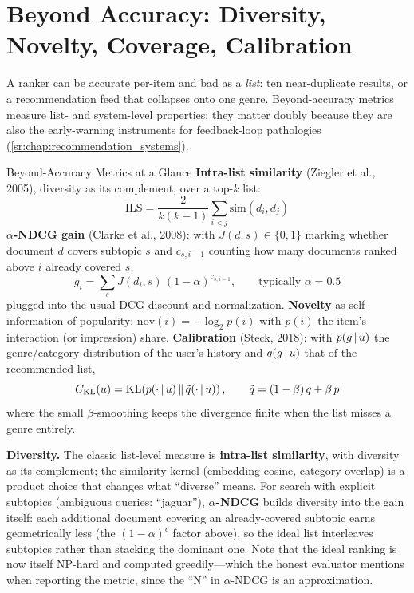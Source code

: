 \section{Beyond Accuracy: Diversity, Novelty, Coverage, Calibration}
\label{sr:sec:eval_beyond_accuracy}

A ranker can be accurate per-item and bad as a \textit{list}: ten near-duplicate results, or a recommendation feed that collapses onto one genre. Beyond-accuracy metrics measure list- and system-level properties; they matter doubly because they are also the early-warning instruments for feedback-loop pathologies (\ref{sr:chap:recommendation_systems}).

\begin{mathresult}{Beyond-Accuracy Metrics at a Glance}
\textbf{Intra-list similarity} (Ziegler et al., 2005), diversity as its complement, over a top-$k$ list:
\begin{equation}
\mathrm{ILS} = \frac{2}{k(k-1)} \sum_{i<j} \mathrm{sim}(d_i, d_j)
\end{equation}
\textbf{$\alpha$-NDCG gain} (Clarke et al., 2008): with $J(d, s) \in \{0,1\}$ marking whether document $d$ covers subtopic $s$ and $c_{s,i-1}$ counting how many documents ranked above $i$ already covered $s$,
\begin{equation}
g_i = \sum_{s} J(d_i, s)\,(1-\alpha)^{c_{s,i-1}}, \qquad \text{typically } \alpha = 0.5
\end{equation}
plugged into the usual DCG discount and normalization. \textbf{Novelty} as self-information of popularity: $\mathrm{nov}(i) = -\log_2 p(i)$ with $p(i)$ the item's interaction (or impression) share. \textbf{Calibration} (Steck, 2018): with $p(g \,|\, u)$ the genre/category distribution of the user's history and $q(g \,|\, u)$ that of the recommended list,
\begin{equation}
C_{\mathrm{KL}}(u) = \mathrm{KL}\!\left(p(\cdot \,|\, u) \,\middle\|\, \tilde{q}(\cdot \,|\, u)\right), \qquad \tilde{q} = (1-\beta)\,q + \beta\, p
\end{equation}
where the small $\beta$-smoothing keeps the divergence finite when the list misses a genre entirely.
\end{mathresult}

\textbf{Diversity.} The classic list-level measure is \textbf{intra-list similarity}, with diversity as its complement; the similarity kernel (embedding cosine, category overlap) is a product choice that changes what ``diverse'' means. For search with explicit subtopics (ambiguous queries: ``jaguar''), \textbf{$\alpha$-NDCG} builds diversity into the gain itself: each additional document covering an already-covered subtopic earns geometrically less (the $(1-\alpha)^{c}$ factor above), so the ideal list interleaves subtopics rather than stacking the dominant one. Note that the ideal ranking is now itself NP-hard and computed greedily---which the honest evaluator mentions when reporting the metric, since the ``N'' in $\alpha$-NDCG is an approximation.

